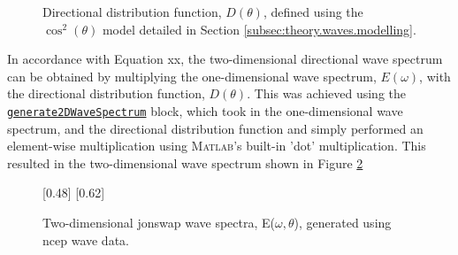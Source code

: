                     



\begin{figure}[H]
    \centering
    \resizebox{0.48\linewidth}{!}{}
    \caption{Directional distribution function, $D(\theta)$, defined using the $\cos^2(\theta)$ model detailed in Section \ref{subsec:theory.waves.modelling}.}
    \label{fig:systemDesign.direcDistributionFunction}
\end{figure}

In accordance with Equation xx, the two-dimensional directional wave spectrum can be obtained by multiplying the one-dimensional wave spectrum, $E(\omega)$, with the directional distribution function, $D(\theta)$. This was achieved using the \href{https://github.com/JNSRYA006/sar-parameter-extraction-pipeline/blob/main/functions/waveSpectra/generate2DWaveSpectrum.m}{\lstinline{generate2DWaveSpectrum}} block, which took in the one-dimensional wave spectrum, and the directional distribution function and simply performed an element-wise multiplication using \textsc{Matlab}'s built-in 'dot' multiplication. This resulted in the two-dimensional wave spectrum shown in Figure \ref{fig:systemDesign.2DSampleWaveSpectrum}
\begin{figure} [H]
    \centering
    [0.48\linewidth]{
        \resizebox{\linewidth}{!}{}
    }
    [0.62\linewidth]{
        \resizebox{\linewidth}{!}{}
    }
    \caption{Two-dimensional \acs{jonswap} wave spectra, E($\omega,\theta$), generated using \acs{ncep} wave data.}
    \label{fig:systemDesign.2DSampleWaveSpectrum}
\end{figure}

